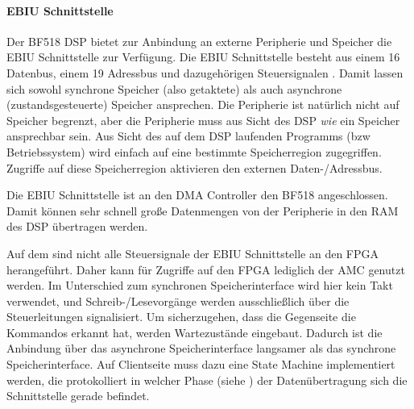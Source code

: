 
\paragraph{EBIU Schnittstelle} \label{ebiuinterface}
Der BF518 DSP bietet zur Anbindung an externe Peripherie und Speicher die \gls{EBIU} Schnittstelle zur Verfügung. Die EBIU Schnittstelle besteht aus einem \SI{16}{\bit} Datenbus, einem \SI{19}{\bit} Adressbus und dazugehörigen Steuersignalen . Damit lassen sich sowohl synchrone Speicher (also getaktete) als auch asynchrone (zustandsgesteuerte) Speicher ansprechen. Die Peripherie ist natürlich nicht auf Speicher begrenzt, aber die Peripherie muss aus Sicht des DSP \emph{wie} ein Speicher ansprechbar sein. Aus Sicht des auf dem DSP laufenden Programms (bzw Betriebssystem) wird einfach auf eine bestimmte Speicherregion zugegriffen. Zugriffe auf diese Speicherregion aktivieren den externen Daten-/Adressbus.



Die EBIU Schnittstelle ist an den \gls{DMA} Controller den BF518 angeschlossen. Damit können sehr schnell große Datenmengen von der Peripherie in den RAM des DSP übertragen werden.

Auf dem \comboard sind nicht alle Steuersignale der EBIU Schnittstelle an den FPGA herangeführt. Daher kann für Zugriffe auf den FPGA lediglich der \gls{AMC} genutzt werden. Im Unterschied zum synchronen Speicherinterface wird hier kein Takt verwendet, und Schreib-/Lesevorgänge werden ausschließlich über die Steuerleitungen signalisiert. Um sicherzugehen, dass die Gegenseite die Kommandos erkannt hat, werden Wartezustände eingebaut. Dadurch ist die Anbindung über das asynchrone Speicherinterface langsamer als das synchrone Speicherinterface. Auf Clientseite muss dazu eine State Machine implementiert werden, die protokolliert in welcher Phase (siehe ) der Datenübertragung sich die Schnittstelle gerade befindet.

